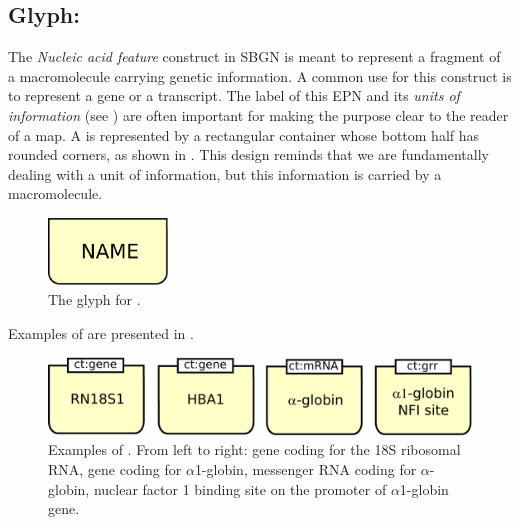 
\subsection{Glyph: }
\label{sec:genetic}

The \emph{Nucleic acid feature} construct in SBGN is meant to represent a fragment of a macromolecule carrying genetic information.  A common use for this construct is to represent a gene or a transcript.  The label of this EPN and its \emph{units of information} (see ) are often important for making the purpose clear to the reader of a map. A  is represented by a rectangular container whose bottom half has rounded corners, as shown in . This design reminds that we are fundamentally dealing with a unit of information, but this information is carried by a macromolecule.

\begin{figure}[H]
  \centering
  \includegraphics[width = 1.25in]{images/genetic}
  \caption{The \PD glyph for .} 
  \label{fig:genetic}
\end{figure}

Examples of  are presented in .

\begin{figure}[H]
  \centering
  \includegraphics[scale = 0.5]{images/NucAcidFeat-examples}
  \caption{Examples of . From left to right: gene coding for the 18S ribosomal RNA, gene coding for $\alpha$1-globin, messenger RNA coding for $\alpha$-globin, nuclear factor 1 binding site on the promoter of $\alpha$1-globin gene.}
  \label{fig:NucAcidFeat-examples}
\end{figure}
